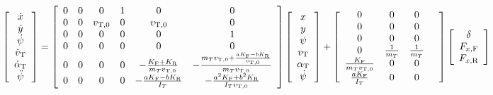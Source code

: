 \documentclass[sublist]{fei}
\begin{document}
\begin{equation}
    \left[ \begin{array}{c} \dot{x} \\ \dot{y} \\ \dot{\psi} \\ \dot{v}_{\rm T} \\ \dot{\alpha}_{\rm T} \\ \ddot{\psi} \end{array} \right] = \left[ \begin{array}{cccccc} 0 & 0 & 0 & 1 & 0 & 0 \\ 0 & 0 & v_{{\rm T},0} & 0 & v_{{\rm T},0} & 0 \\ 0 & 0 & 0 & 0 & 0 & 1 \\ 0 & 0 & 0 & 0 & 0 & 0 \\ 0 & 0 & 0 & 0 & - \frac{K_{\rm F} + K_{\rm R}}{m_{T} v_{{\rm T},0}} & - \frac{m_{T} v_{{\rm T},0} + \frac{a K_{\rm F} - b K_{\rm R}}{v_{{\rm T},0}}}{m_{T} v_{{\rm T},0}} \\ 0 & 0 & 0 & 0 & - \frac{a K_{\rm F} - b K_{\rm R}}{I_{T}} & - \frac{a^2 K_{\rm F} + b^2 K_{\rm R}}{I_{T}  v_{{\rm T},0}} \end{array} \right] \left[ \begin{array}{c} x \\ y \\ \psi \\ v_{\rm T} \\ \alpha_{\rm T} \\ \dot{\psi} \end{array} \right] + \left[ \begin{array}{ccccc} 0 & 0 & 0 & \\ 0 & 0 & 0 & \\ 0 & 0 & 0 & \\ 0 & \frac{1}{m_{T}} & \frac{1}{m_{T}} & \\ \frac{K_{\rm F}}{m_{T} v_{{\rm T},0}} & 0 & 0 & \\  \frac{a K_{\rm F}}{I_{T}} & 0 & 0 \end{array} \right] \left[ \begin{array}{c} \delta \\ F_{x,{\rm F}} \\ F_{x,{\rm R}} \end{array} \right]
\end{equation}





\end{document}
